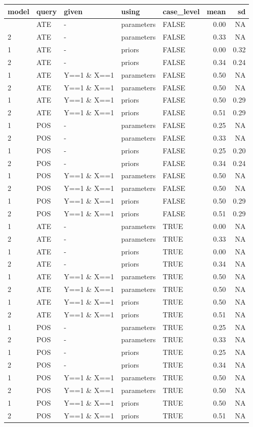\documentclass[
  article]{jss}
\begin{document}
\begin{longtable}[]{@{}lllllrr@{}}
\toprule\noalign{}
model & query & given & using & case\_level & mean & sd \\
\midrule\noalign{}
\endhead
\bottomrule\noalign{}
\endlastfoot
1 & ATE & - & parameters & FALSE & 0.00 & NA \\
2 & ATE & - & parameters & FALSE & 0.33 & NA \\
1 & ATE & - & priors & FALSE & 0.00 & 0.32 \\
2 & ATE & - & priors & FALSE & 0.34 & 0.24 \\
1 & ATE & Y==1 \& X==1 & parameters & FALSE & 0.50 & NA \\
2 & ATE & Y==1 \& X==1 & parameters & FALSE & 0.50 & NA \\
1 & ATE & Y==1 \& X==1 & priors & FALSE & 0.50 & 0.29 \\
2 & ATE & Y==1 \& X==1 & priors & FALSE & 0.51 & 0.29 \\
1 & POS & - & parameters & FALSE & 0.25 & NA \\
2 & POS & - & parameters & FALSE & 0.33 & NA \\
1 & POS & - & priors & FALSE & 0.25 & 0.20 \\
2 & POS & - & priors & FALSE & 0.34 & 0.24 \\
1 & POS & Y==1 \& X==1 & parameters & FALSE & 0.50 & NA \\
2 & POS & Y==1 \& X==1 & parameters & FALSE & 0.50 & NA \\
1 & POS & Y==1 \& X==1 & priors & FALSE & 0.50 & 0.29 \\
2 & POS & Y==1 \& X==1 & priors & FALSE & 0.51 & 0.29 \\
1 & ATE & - & parameters & TRUE & 0.00 & NA \\
2 & ATE & - & parameters & TRUE & 0.33 & NA \\
1 & ATE & - & priors & TRUE & 0.00 & NA \\
2 & ATE & - & priors & TRUE & 0.34 & NA \\
1 & ATE & Y==1 \& X==1 & parameters & TRUE & 0.50 & NA \\
2 & ATE & Y==1 \& X==1 & parameters & TRUE & 0.50 & NA \\
1 & ATE & Y==1 \& X==1 & priors & TRUE & 0.50 & NA \\
2 & ATE & Y==1 \& X==1 & priors & TRUE & 0.51 & NA \\
1 & POS & - & parameters & TRUE & 0.25 & NA \\
2 & POS & - & parameters & TRUE & 0.33 & NA \\
1 & POS & - & priors & TRUE & 0.25 & NA \\
2 & POS & - & priors & TRUE & 0.34 & NA \\
1 & POS & Y==1 \& X==1 & parameters & TRUE & 0.50 & NA \\
2 & POS & Y==1 \& X==1 & parameters & TRUE & 0.50 & NA \\
1 & POS & Y==1 \& X==1 & priors & TRUE & 0.50 & NA \\
2 & POS & Y==1 \& X==1 & priors & TRUE & 0.51 & NA \\
\end{longtable}
\end{document}
